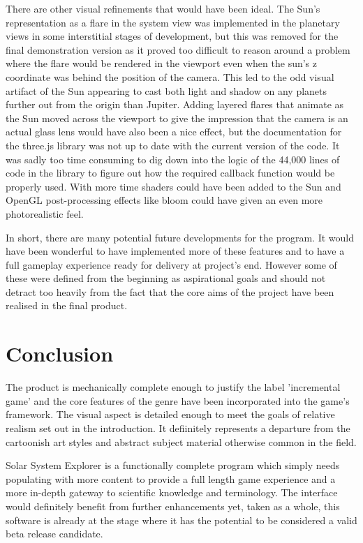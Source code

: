 \documentclass[twoside]{bhamthesis}
\begin{document}
There are other visual refinements that would have been ideal. The Sun's representation as a flare in the system view was implemented in the planetary views in some interstitial stages of development, but this was removed for the final demonstration version as it proved too difficult to reason around a problem where the flare would be rendered in the viewport even when the sun's z coordinate was behind the position of the camera. This led to the odd visual artifact of the Sun appearing to cast both light and shadow on any planets further out from the origin than Jupiter. Adding layered flares that animate as the Sun moved across the viewport to give the impression that the camera is an actual glass lens would have also been a nice effect, but the documentation for the three.js library was not up to date with the current version of the code. It was sadly too time consuming to dig down into the logic of the 44,000 lines of code in the library to figure out how the required callback function would be properly used. With more time shaders could have been added to the Sun and OpenGL post-processing effects like bloom could have given an even more photorealistic feel.

In short, there are many potential future developments for the program. It would have been wonderful to have implemented more of these features and to have a full gameplay experience ready for delivery at project's end. However some of these were defined from the beginning as aspirational goals and should not detract too heavily from the fact that the core aims of the project have been realised in the final product.

\section{Conclusion}

The product is mechanically complete enough to justify the label 'incremental game' and the core features of the genre have been incorporated into the game's framework. The visual aspect is detailed enough to meet the goals of relative realism set out in the introduction. It defiinitely represents a departure from the cartoonish art styles and abstract subject material otherwise common in the field.

Solar System Explorer is a functionally complete program which simply needs populating with more content to provide a full length game experience and a more in-depth gateway to scientific knowledge and terminology. The interface would definitely benefit from further enhancements yet, taken as a whole, this software is already at the stage where it has the potential to be considered a valid beta release candidate.
\end{document}
